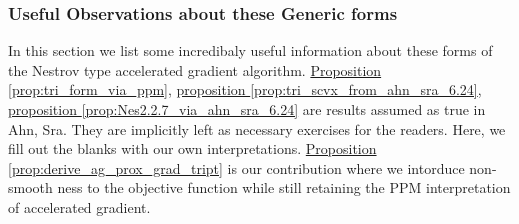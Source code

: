         
        \begin{definition}
        \label{def:ag_form_similar_tria_II}
            
        \end{definition}


    \subsubsection{Useful Observations about these Generic forms}
    \label{sec:AG_useful_information}

        In this section we list some incredibaly useful information about these forms of the Nestrov type accelerated gradient algorithm. 
        \hyperref[prop:tri_form_via_ppm]{Proposition \ref*{prop:tri_form_via_ppm}}, 
        \hyperref[prop:tri_scvx_from_ahn_sra_6.24]{proposition \ref*{prop:tri_scvx_from_ahn_sra_6.24}}, 
        \hyperref[prop:Nes2.2.7_via_ahn_sra_6.24]{proposition \ref*{prop:Nes2.2.7_via_ahn_sra_6.24}}
        are results assumed as true in Ahn, Sra. 
        They are implicitly left as necessary exercises for the readers. 
        Here, we fill out the blanks with our own interpretations. 
        \hyperref[prop:derive_ag_prox_grad_tript]{Proposition \ref*{prop:derive_ag_prox_grad_tript}} 
        is our contribution where we intorduce non-smooth ness to the objective function while still retaining the PPM interpretation of accelerated gradient. 
        
